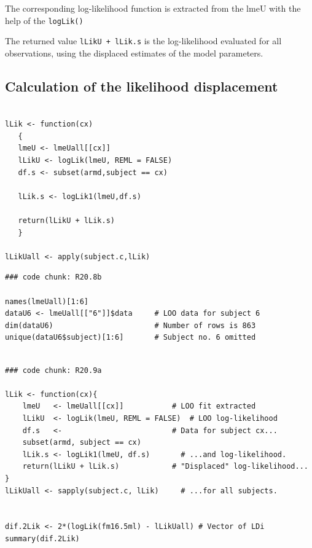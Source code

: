 \documentclass[a4paper,12pt]{article}
\begin{document}
The corresponding log-likelihood function is extracted from the lmeU with the help of the \texttt{logLik()}


The returned value \texttt{lLikU + lLik.s} is the log-likelihood evaluated for all observations, using the displaced estimates of the model parameters.


\subsection{Calculation of the likelihood displacement}

\begin{framed}
\begin{verbatim}

lLik <- function(cx)
   {
   lmeU <- lmeUall[[cx]]
   lLikU <- logLik(lmeU, REML = FALSE)
   df.s <- subset(armd,subject == cx)
 
   lLik.s <- logLik1(lmeU,df.s)

   return(lLikU + lLik.s)
   }

lLikUall <- apply(subject.c,lLik)

\end{verbatim}
\end{framed}

%

\begin{framed}
	\begin{verbatim}
### code chunk: R20.8b

names(lmeUall)[1:6]                             
dataU6 <- lmeUall[["6"]]$data     # LOO data for subject 6
dim(dataU6)                       # Number of rows is 863
unique(dataU6$subject)[1:6]       # Subject no. 6 omitted

\end{verbatim}
\end{framed}

\begin{framed}
	\begin{verbatim}

### code chunk: R20.9a

lLik <- function(cx){                  
	lmeU   <- lmeUall[[cx]]           # LOO fit extracted 
	lLikU  <- logLik(lmeU, REML = FALSE)  # LOO log-likelihood
	df.s   <-                         # Data for subject cx...
	subset(armd, subject == cx)                 
	lLik.s <- logLik1(lmeU, df.s)       # ...and log-likelihood.
	return(lLikU + lLik.s)            # "Displaced" log-likelihood...
}
lLikUall <- sapply(subject.c, lLik)     # ...for all subjects.         


dif.2Lik <- 2*(logLik(fm16.5ml) - lLikUall) # Vector of LDi
summary(dif.2Lik)

\end{verbatim}
\end{framed}
\end{document}
